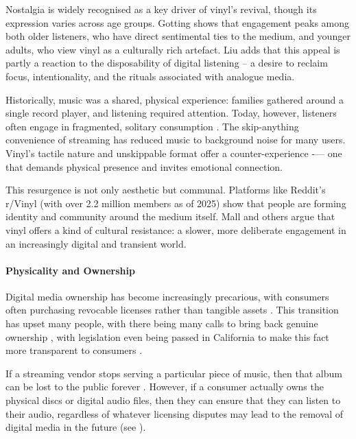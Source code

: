                 Nostalgia is widely recognised as a key driver of vinyl’s revival, though its expression varies across age groups. Gotting \cite{Gotting2021} shows that engagement peaks among both older listeners, who have direct sentimental ties to the medium, and younger adults, who view vinyl as a culturally rich artefact. Liu \cite{Liu2020} adds that this appeal is partly a reaction to the disposability of digital listening -- a desire to reclaim focus, intentionality, and the rituals associated with analogue media.
    
                Historically, music was a shared, physical experience: families gathered around a single record player, and listening required attention. Today, however, listeners often engage in fragmented, solitary consumption \cite{historyandrevivalofvinyls}. The skip-anything convenience of streaming has reduced music to background noise for many users. Vinyl’s tactile nature and unskippable format offer a counter-experience -— one that demands physical presence and invites emotional connection.
    
                This resurgence is not only aesthetic but communal. Platforms like Reddit’s r/Vinyl (with over 2.2 million members as of 2025) show that people are forming identity and community around the medium itself. Mall \cite{vinylRevival} and others argue that vinyl offers a kind of cultural resistance: a slower, more deliberate engagement in an increasingly digital and transient world.
          
            \paragraph{Physicality and Ownership} %
    
                Digital media ownership has become increasingly precarious, with consumers often purchasing revocable licenses rather than tangible assets \cite{verge2024steam_license}. This transition has upset many people, with there being many calls to bring back genuine ownership \cite{stanton2024gamers_pushback}, with legislation even being passed in California to make this fact more transparent to consumers \cite{california2024ab2426}.
    
                If a streaming vendor stops serving a particular piece of music, then that album can be lost to the public forever \cite{polygon2024cartoon_network_delisting}. However, if a consumer actually owns the physical discs or digital audio files, then they can ensure that they can listen to their audio, regardless of whatever licensing disputes may lead to the removal of digital media in the future (see \cite{bains2022lotr_strategy}).
    
